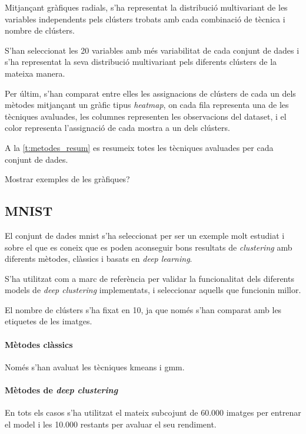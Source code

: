 \documentclass[CAT,BIB]{TFUOC}%
\newcommand{\todo}[1]{
            \begin{tcolorbox}[title=ToDo!, colback=red!5!white, colframe=red!50!black, coltext=red!50!black]
            #1
            \end{tcolorbox}}
\begin{document}
        Mitjançant gràfiques radials,
        s'ha representat la distribució multivariant
        de les variables independents
        pels clústers trobats amb cada combinació de tècnica i nombre de clústers.

        S'han seleccionat les 20 variables amb més variabilitat de cada conjunt de dades
        i s'ha representat la seva distribució multivariant
        pels diferents clústers de la mateixa manera.

        Per últim,
        s'han comparat entre elles les assignacions de clústers de cada un dels mètodes
        mitjançant un gràfic tipus \textit{heatmap},
        on cada fila representa una de les tècniques avaluades,
        les columnes representen les observacions del dataset,
        i el color representa l'assignació de cada mostra a un dels clústers.

        A la \cref{t:metodes_resum} es resumeix totes les tècniques
        avaluades per cada conjunt de dades.

\todo{Mostrar exemples de les gràfiques?}

        \subsection{MNIST}
        \label{s:mnist}

            El conjunt de dades \gls{mnist}
            s'ha seleccionat per ser un exemple molt estudiat
            i sobre el que es coneix que
            es poden aconseguir bons resultats de \textit{clustering}
            amb diferents mètodes, clàssics i basats en \textit{deep learning}.

            S'ha utilitzat com a marc de referència
            per validar la funcionalitat
            dels diferents models de \textit{deep clustering} implementats,
            i seleccionar aquells que funcionin millor.

            El nombre de clústers s'ha fixat en 10,
            ja que només s'han comparat amb les etiquetes de les imatges.

            \paragraph{Mètodes clàssics}
                Només s'han avaluat les tècniques \gls{kmeans} i \gls{gmm}.

            \paragraph{Mètodes de \textit{deep clustering}}
                En tots els casos s'ha utilitzat
                el mateix subcojunt de 60.000 imatges per entrenar el model
                i les 10.000 restants per avaluar el seu rendiment.
\end{document}
